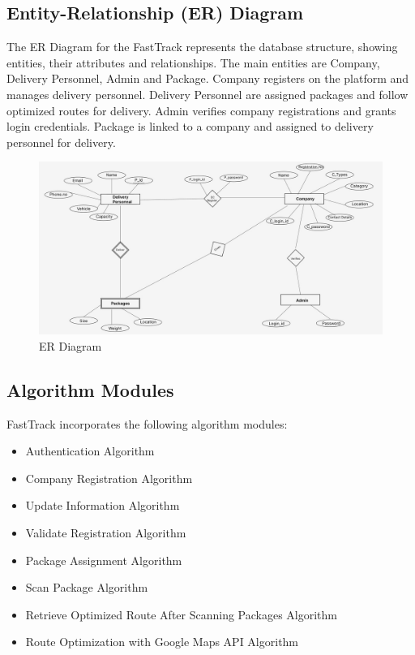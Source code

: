 \subsection{Entity-Relationship (ER) Diagram}
The ER Diagram for the FastTrack represents the database structure, showing entities, their attributes and relationships. The main entities are Company, Delivery Personnel, Admin and Package. Company registers on the platform and manages delivery personnel. Delivery Personnel are assigned packages and follow optimized routes for delivery.
Admin verifies company registrations and grants login credentials. Package is linked to a company and assigned to delivery personnel for delivery.
\begin{figure}[H]  %
\centering
    \includegraphics[scale=0.3]{ERdiagram2.jpg}
    \caption{ER Diagram}
    \label{fig:er_diagram2}
\end{figure}
\subsection{Algorithm Modules}
FastTrack incorporates the following algorithm modules:
\begin{itemize}
    \item Authentication Algorithm
    \item Company Registration Algorithm
    \item Update Information Algorithm
    \item Validate Registration Algorithm
        \item Package Assignment Algorithm
    \item Scan Package Algorithm
    \item Retrieve Optimized Route After Scanning Packages Algorithm
    \item Route Optimization with Google Maps API Algorithm
\end{itemize}
\newpage

